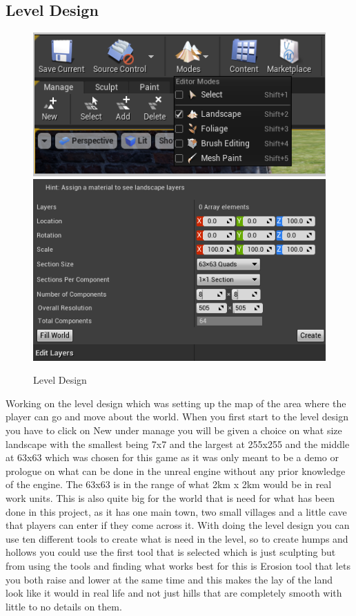 \subsection{Level Design}
\begin{figure}[H]
    \centering
    \includegraphics[scale=.7]{img/Landscape.PNG}
    \includegraphics[scale=.6]{img/ManageLandscape.PNG}
    \caption{Level Design}
    \label{Level Design}
\end{figure}
Working on the level design which was setting up the map of the area where the player can go and move about the world. When you first start to the level design you have to click on New under manage you will be given a choice on what size landscape with the smallest being 7x7 and the largest at 255x255 and the middle at 63x63 which was chosen for this game as it was only meant to be a demo or prologue on what can be done in the unreal engine without any prior knowledge of the engine. The 63x63 is in the range of what 2km x 2km would be in real work units. This is also quite big for the world that is need for what has been done in this project, as it has one main town, two small villages and a little cave that players can enter if they come across it. With doing the level design you can use ten different tools to create what is need in the level, so to create humps and hollows you could use the first tool that is selected which is just sculpting but from using the tools and finding what works best for this is Erosion tool that lets you both raise and lower at the same time and this makes the lay of the land look like it would in real life and not just hills that are completely smooth with little to no details on them.
